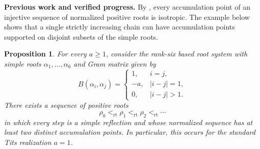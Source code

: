 \documentclass[11pt,reqno]{amsart}
\theoremstyle{plain}
\newtheorem{proposition}[theorem]{Proposition}
\theoremstyle{definition}
\theoremstyle{remark}
\numberwithin{equation}{section}
\begin{document}
\par\medskip
\noindent\textbf{Previous work and verified progress.}
By \cite[Theorem~2.7]{HLR}, every accumulation point of an
injective sequence of normalized positive roots is isotropic.
The example below shows that a single strictly increasing chain
can have accumulation points supported on disjoint subsets of
the simple roots.

\begin{proposition}
\label{prop:nonconvergent-root-poset-chain}
For every $a\geq1$, consider the rank-six based root system with
simple roots $\alpha_1,\ldots,\alpha_6$ and Gram matrix given by
\[
B(\alpha_i,\alpha_j)=
\begin{cases}
  1,  & i=j,\\
  -a, & |i-j|=1,\\
  0,  & |i-j|>1.
\end{cases}
\]
There exists a sequence of positive roots
\[
\rho_0<_{\mathrm{rt}}\rho_1<_{\mathrm{rt}}\rho_2
<_{\mathrm{rt}}\cdots
\]
in which every step is a simple reflection and whose normalized
sequence has at least two distinct accumulation points.
In particular, this occurs for the standard Tits realization
$a=1$.
\end{proposition}
\end{document}
